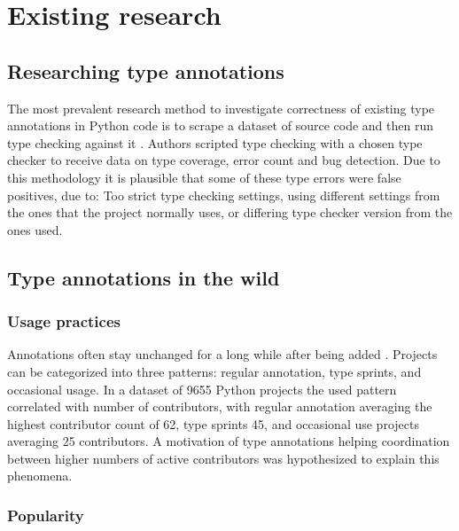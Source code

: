 \chapter{Existing research\label{related_work}}
\section{Researching type annotations}

The most prevalent research method to investigate correctness of existing type annotations in Python code is to scrape a dataset of source code and then run type checking against it \cite{di_grazia_evolution_2022, lin_towards_large_scale_2023, rak-amnouykit_taleoftwo_2020, xu_how_well_static_2023}. Authors scripted type checking with a chosen type checker to receive data on type coverage, error count and bug detection. Due to this methodology it is plausible that some of these type errors were false positives, due to: Too strict type checking settings, using different settings from the ones that the project normally uses, or differing type checker version from the ones used.



\section{Type annotations in the wild}

\subsection{Usage practices}

Annotations often stay unchanged for a long while after being added \cite{di_grazia_evolution_2022}. Projects can be categorized into three patterns: regular annotation, type sprints, and occasional usage. In a dataset of 9655 Python projects the used pattern correlated with number of contributors, with regular annotation averaging the highest contributor count of 62, type sprints 45, and occasional use projects averaging 25 contributors. A motivation of type annotations helping coordination between higher numbers of active contributors was hypothesized to explain this phenomena.

\subsection{Popularity}

